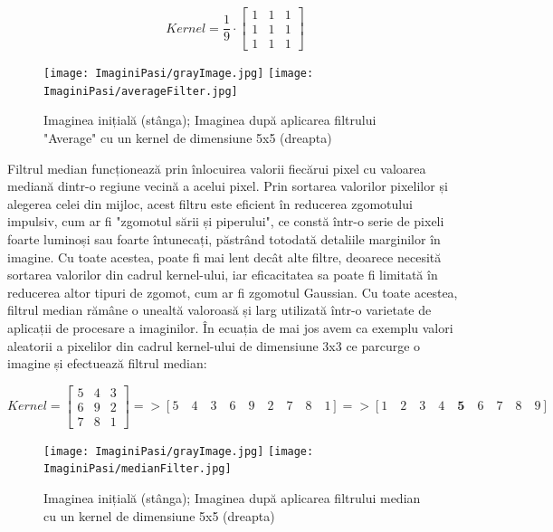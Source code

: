 \documentclass[12pt]{article}
\begin{document}
\begin{equation}
    Kernel=\frac{1}{9} \cdot \begin{bmatrix}
        1 & 1 & 1 \\
        1 & 1 & 1 \\
        1 & 1 & 1 
    \end{bmatrix}
\end{equation}

\begin{figure}[H]
  \centering
  \texttt{[image: ImaginiPasi/grayImage.jpg]}\hfill
  \texttt{[image: ImaginiPasi/averageFilter.jpg]}
  \caption{Imaginea inițial\u{a} (st\^{a}nga); Imaginea dup\u{a} aplicarea filtrului "Average" cu un kernel de dimensiune 5x5 (dreapta)}
  \label{fig:filtrul_average}
\end{figure}

Filtrul median funcționeaz\u{a} prin \^{i}nlocuirea valorii fiec\u{a}rui pixel cu valoarea median\u{a} dintr-o regiune vecin\u{a} a acelui pixel. Prin sortarea valorilor pixelilor și alegerea celei din mijloc, acest filtru este eficient \^{i}n reducerea zgomotului impulsiv, cum ar fi "zgomotul s\u{a}rii și piperului", ce const\u{a} \^{i}ntr-o serie de pixeli foarte luminoși sau foarte \^{i}ntunecați, p\u{a}str\^{a}nd totodat\u{a} detaliile marginilor în imagine. Cu toate acestea, poate fi mai lent decât alte filtre, deoarece necesit\u{a} sortarea valorilor din cadrul kernel-ului, iar eficacitatea sa poate fi limitat\u{a} \^{i}n reducerea altor tipuri de zgomot, cum ar fi zgomotul Gaussian. Cu toate acestea, filtrul median r\u{a}m\^{a}ne o unealt\u{a} valoroas\u{a} și larg utilizat\u{a} \^{i}ntr-o varietate de aplicații de procesare a imaginilor. \^{I}n ecuația de mai jos avem ca exemplu valori aleatorii a pixelilor din cadrul kernel-ului de dimensiune 3x3 ce parcurge o imagine și efectueaz\u{a} filtrul median: 

\begin{equation}
        Kernel=\begin{bmatrix}
        5 & 4 & 3 \\
        6 & 9 & 2 \\
        7 & 8 & 1 
    \end{bmatrix} => [5 \quad 4 \quad  3 \quad  6 \quad  9 \quad  2 \quad 7 \quad 8 \quad  1] => [1 \quad 2 \quad  3 \quad  4 \quad  \mathbf{5} \quad  6 \quad 7 \quad 8 \quad  9]
\end{equation}

\begin{figure}[H]
  \centering
  \texttt{[image: ImaginiPasi/grayImage.jpg]}\hfill
  \texttt{[image: ImaginiPasi/medianFilter.jpg]}
  \caption{Imaginea inițial\u{a} (st\^{a}nga); Imaginea dup\u{a} aplicarea filtrului median cu un kernel de dimensiune 5x5 (dreapta)}
  \label{fig:filtrul_median}
\end{figure}
\end{document}
